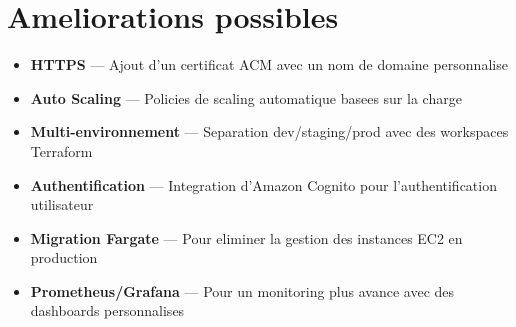 \section{Ameliorations possibles}

\begin{itemize}
    \item \textbf{HTTPS} --- Ajout d'un certificat ACM avec un nom de domaine personnalise
    \item \textbf{Auto Scaling} --- Policies de scaling automatique basees sur la charge
    \item \textbf{Multi-environnement} --- Separation dev/staging/prod avec des workspaces
        Terraform
    \item \textbf{Authentification} --- Integration d'Amazon Cognito pour l'authentification
        utilisateur
    \item \textbf{Migration Fargate} --- Pour eliminer la gestion des instances EC2
        en production
    \item \textbf{Prometheus/Grafana} --- Pour un monitoring plus avance avec des dashboards
        personnalises
\end{itemize}

